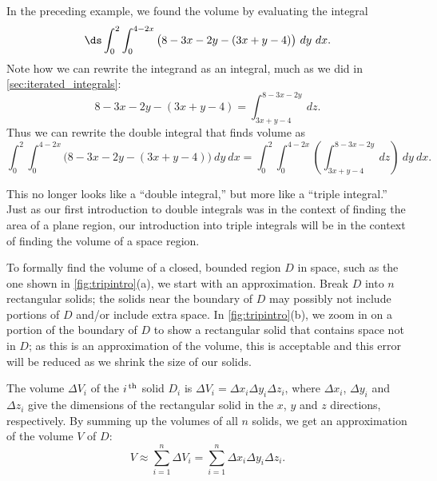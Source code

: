 In the preceding example, we found the volume by evaluating the integral
\[\ds \int_0^2\int_0^{4-2x} \big(8-3x-2y-(3x+y-4)\big)\ dy\ dx.\]
Note how we can rewrite the integrand as an integral, much as we did in \autoref{sec:iterated_integrals}:
\[8-3x-2y-(3x+y-4) = \int_{3x+y-4}^{8-3x-2y}\ dz.\]
Thus we can rewrite the double integral that finds volume as
\[\int_0^2\int_0^{4-2x} \big(8-3x-2y-(3x+y-4)\big)\ dy\ dx = \int_0^2\int_0^{4-2x}\left(\int_{3x+y-4}^{8-3x-2y}\ dz\right)\ dy\ dx.\]

This no longer looks like a ``double integral,'' but more like a ``triple integral.'' Just as our first introduction to double integrals was in the context of finding the area of a plane region, our introduction into triple integrals will be in the context of finding the volume of a space region.


To formally find the volume of a closed, bounded region $D$ in space, such as the one shown in \autoref{fig:tripintro}(a), we start with an approximation. Break $D$ into $n$ rectangular solids; the solids near the boundary of $D$ may possibly not include portions of $D$ and/or include extra space. In \autoref{fig:tripintro}(b), we zoom in on a portion of the boundary of $D$ to show a rectangular solid that contains space not in $D$; as this is an approximation of the volume, this is acceptable and this error will be reduced as we shrink the size of our solids.

The volume $\Delta V_i$ of the $i^\text{\,th}$ solid $D_i$ is $\Delta V_i = \Delta x_i\Delta y_i\Delta z_i$, where $\Delta x_i$, $\Delta y_i$ and $\Delta z_i$ give the dimensions of the rectangular solid in the $x$, $y$ and $z$ directions, respectively. By summing up the volumes of all $n$ solids, we get an approximation of the volume $V$ of $D$:
\[V \approx \sum_{i=1}^n \Delta V_i = \sum_{i=1}^n \Delta x_i\Delta y_i\Delta z_i.\]

